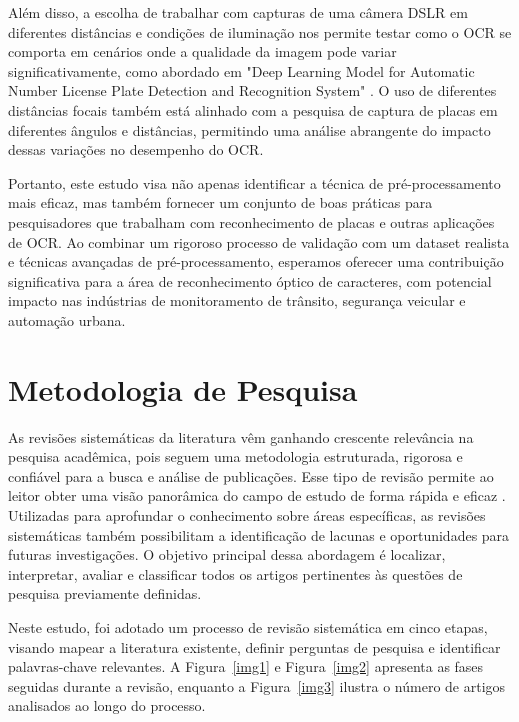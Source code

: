 \documentclass[conference]{IEEEtran}
\begin{document}
Além disso, a escolha de trabalhar com capturas de uma câmera DSLR em diferentes distâncias e condições de iluminação nos permite testar como o OCR se comporta em cenários onde a qualidade da imagem pode variar significativamente, como abordado em "Deep Learning Model for Automatic Number License Plate Detection and Recognition System" \cite{b3}. O uso de diferentes distâncias focais também está alinhado com a pesquisa de captura de placas em diferentes ângulos e distâncias, permitindo uma análise abrangente do impacto dessas variações no desempenho do OCR.

Portanto, este estudo visa não apenas identificar a técnica de pré-processamento mais eficaz, mas também fornecer um conjunto de boas práticas para pesquisadores que trabalham com reconhecimento de placas e outras aplicações de OCR. Ao combinar um rigoroso processo de validação com um dataset realista e técnicas avançadas de pré-processamento, esperamos oferecer uma contribuição significativa para a área de reconhecimento óptico de caracteres, com potencial impacto nas indústrias de monitoramento de trânsito, segurança veicular e automação urbana. 

\section{Metodologia de Pesquisa}

As revisões sistemáticas da literatura vêm ganhando crescente relevância na pesquisa acadêmica, pois seguem uma metodologia estruturada, rigorosa e confiável para a busca e análise de publicações. Esse tipo de revisão permite ao leitor obter uma visão panorâmica do campo de estudo de forma rápida e eficaz \cite{b4}. Utilizadas para aprofundar o conhecimento sobre áreas específicas, as revisões sistemáticas também possibilitam a identificação de lacunas e oportunidades para futuras investigações. O objetivo principal dessa abordagem é localizar, interpretar, avaliar e classificar todos os artigos pertinentes às questões de pesquisa previamente definidas.

Neste estudo, foi adotado um processo de revisão sistemática em cinco etapas, visando mapear a literatura existente, definir perguntas de pesquisa e identificar palavras-chave relevantes. A Figura~\ref{img1} e Figura~\ref{img2} apresenta as fases seguidas durante a revisão, enquanto a Figura~\ref{img3} ilustra o número de artigos analisados ao longo do processo.
\end{document}
